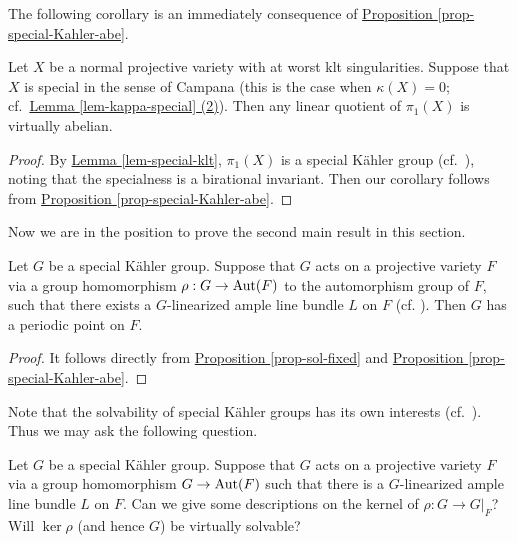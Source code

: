 The following corollary is an immediately consequence of {\hyperref[prop-special-Kahler-abe]{Proposition  \ref*{prop-special-Kahler-abe}}}. 

\begin{cor}\label{cor-virtually-abelian}
Let $X$ be a normal projective variety with at worst klt singularities.
Suppose that $X$ is special in the sense of Campana (this is the case when $\kappa(X)=0$; cf.~{\hyperref[lem-kappa-special]{Lemma  \ref*{lem-kappa-special} (2)}}).
Then any linear quotient of $\pi_1(X)$ is virtually abelian.
\end{cor}



\begin{proof}
By {\hyperref[lem-special-klt]{Lemma \ref*{lem-special-klt}}}, 
$\pi_1(X)$ is a special K\"ahler group (cf.~\cite{Tak03}),
noting that the specialness is a birational invariant. 
Then our corollary follows from {\hyperref[prop-special-Kahler-abe]{Proposition  \ref*{prop-special-Kahler-abe}}}. 
\end{proof}

Now we are in the position to prove the second main result in this section.

\begin{prop}\label{prop_fund_pp}
Let $G$ be a special K\"ahler group.
Suppose that  $G$ acts on a projective variety $F$ via a group homomorphism $\rho:G\to\operatorname{Aut}(F)$ to the automorphism group of $F$, such that there exists a $G$-linearized  ample line bundle $L$ on $F$  (cf. \cite[Defintion 3.2.3, Lemma 3.2.4]{Brion18}).
Then $G$ has a periodic point on $F$.
\end{prop}






\begin{proof}
	It follows directly from {\hyperref[prop-sol-fixed]{Proposition \ref*{prop-sol-fixed}}} and {\hyperref[prop-special-Kahler-abe]{Proposition \ref*{prop-special-Kahler-abe}}}.
\end{proof}


Note that the solvability of special K\"ahler groups has its own  interests (cf.~\cite[Conjecture 7.1]{Cam04}). Thus we may ask the following question.

\begin{ques}\label{ques-kernel-sol}
	Let $G$ be a special K\"ahler group.
	Suppose that $G$ acts on a projective variety $F$ via a group homomorphism $G\to\operatorname{Aut}(F)$ such that there is a $G$-linearized  ample line bundle $L$ on $F$.
	Can we give some descriptions on the kernel of $\rho: G\to G|_F$? 
	Will $\ker\rho$ (and hence $G$) be virtually solvable?
\end{ques}

